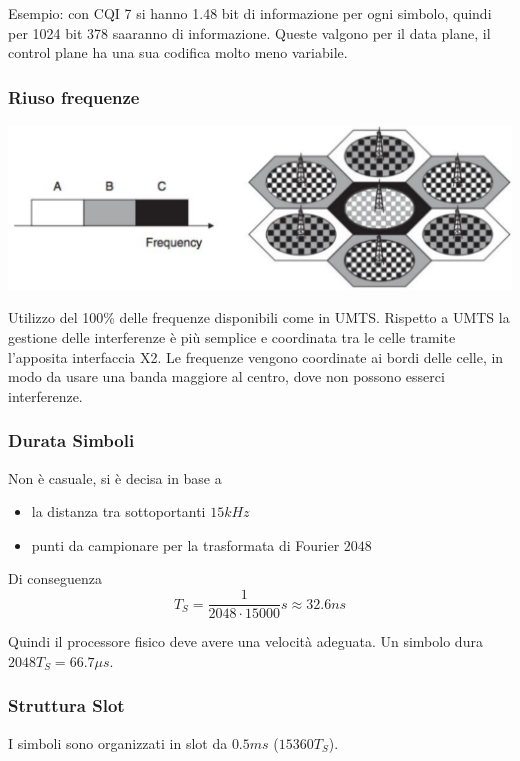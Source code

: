 Esempio: con CQI 7 si hanno 1.48 bit di informazione per ogni simbolo, quindi per 1024 bit 378 saaranno di informazione. Queste valgono per il data plane, il control plane ha una sua codifica molto meno variabile.\\

\subsubsection{Riuso frequenze}
\begin{center}
	\includegraphics[width=0.9\linewidth]{img/4g/riuso4g}
\end{center}
Utilizzo del 100\% delle frequenze disponibili come in UMTS.  Rispetto a UMTS la gestione delle interferenze è più semplice e coordinata tra le celle tramite l’apposita interfaccia X2. Le frequenze vengono coordinate ai bordi delle celle, in modo da usare una banda maggiore al centro, dove non possono esserci interferenze.\\

\subsubsection{Durata Simboli}

Non è casuale, si è decisa in base a
\begin{itemize}
	\item la distanza tra sottoportanti $15kHz$
	\item punti da campionare per la trasformata di Fourier $2048$
\end{itemize}

Di conseguenza
$$ T_S = \frac{1}{2048 \cdot 15000}s \approx 32.6 ns $$

Quindi il processore fisico deve avere una velocità adeguata. Un simbolo dura $2048 T_S = 66.7 \mu s$.\\

\newpage

\subsubsection{Struttura Slot}
I simboli sono organizzati in slot da $0.5ms$ ($15360 T_S$).\\

